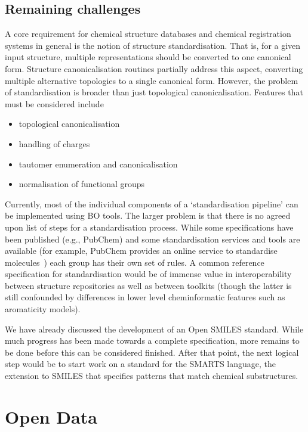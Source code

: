 \documentclass[10pt]{bmc_article}
\newenvironment{bmcformat}{\fussy\setboolean{publ}{true}}{\fussy}
\begin{document}
\begin{bmcformat}
\subsection*{Remaining challenges}

A core requirement for chemical structure databases and chemical
registration systems in general is the notion of structure
standardisation.  That is,  for a given input structure, multiple
representations should be converted to one canonical form.
Structure canonicalisation routines partially address this aspect,
converting multiple alternative topologies to a single canonical
form. However, the problem of standardisation is broader than just
topological canonicalisation. Features that must be considered include
\begin{itemize}
\item topological canonicalisation
\item handling of charges
\item tautomer enumeration and canonicalisation
\item normalisation of functional groups
\end{itemize}
Currently, most of the individual components of a `standardisation
pipeline' can be implemented using BO tools. The larger problem is
that there is no agreed upon list of steps for a standardisation
process. While some specifications have been published (e.g., PubChem)
and some standardisation services and tools are available (for
example, PubChem
provides an online service to standardise
molecules~\cite{WebPubChemStandardizer})
each group has their own set of rules. A
common reference specification for standardisation would be of immense
value in interoperability between structure repositories as well as
between toolkits (though the latter is still confounded by differences
in lower level cheminformatic features such as aromaticity models).

We have already discussed the development of an Open SMILES standard.
While much progress has been made towards a complete specification,
more remains to be done before this can be considered finished. After
that point, the next logical step would be to start work on a standard
for the SMARTS language, the extension to SMILES that specifies
patterns that match chemical substructures.

\section*{Open Data}


\end{bmcformat}
\end{document}
